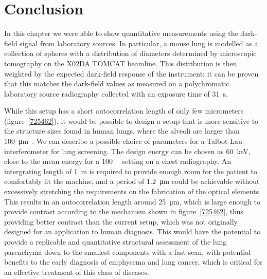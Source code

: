 \section{Conclusion}
In this chapter we were able to show quantitative measurements using the
dark-field signal from laboratory sources. In particular, a mouse lung is
modelled as a collection of spheres with a distribution of diameters determined
by microscopic tomography on the X02DA TOMCAT beamline. This distribution is
then weighted by the expected dark-field response of the instrument; it can
be proven that this matches the dark-field values as measured on a
polychromatic laboratory source radiography collected with an exposure time
of \SI{31}{\second}.

While this setup has a short autocorrelation length of only few micrometers
(figure~\ref{725462}), it would be possible to design a setup that is more
sensitive to the structure sizes found in human lungs, where the alveoli are
larger than
\SI{100}{\micro\meter}~\parencite{doi:10.1164/rccm.200308-1107OC}. We can describe a
possible choice of parameters for a Talbot-Lau interferometer for lung
screening. The design energy can be chosen as \SI{60}{\kilo\eV}, close to
the mean energy for a \SI{100}{\kilo\voltpeak} setting on a chest
radiography. An intergrating length of \SI{1}{\meter} is required to provide
enough room for the patient to comfortably fit the machine,
and a period of \SI{1.2}{\micro\meter} could be achievable without
excessively stretching the requirements on the fabrication of the optical
elements. This results in an autocorrelation length around
\SI{25}{\micro\meter}, which is large enough to provide contrast according
to the mechanism shown in figure~\ref{725462}, thus providing better contrast than the
current setup, which was not originally designed for an application to human
diagnosis.
This would have the potential to provide a replicable and quantitative
structural assessment of the lung parenchyma down to the smallest components
with a fast scan, with potential benefits to the early diagnosis of
emphysema and lung cancer, which is critical for an effective treatment of
this class of diseases.
